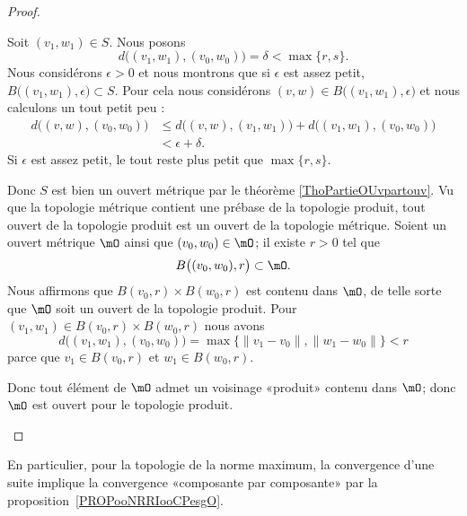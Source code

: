 \begin{proof}
\begin{subproof}
\begin{subproof}
			Soit \( (v_1,w_1)\in S\). Nous posons
			\begin{equation}
				d\big( (v_1,w_1), (v_0,w_0) \big)=\delta<\max\{ r,s \}.
			\end{equation}
			Nous considérons \( \epsilon>0\) et nous montrons que si \( \epsilon\) est assez petit, \( B\big( (v_1,w_1),\epsilon \big)\subset S\). Pour cela nous considérons \( (v,w)\in B\big( (v_1,w_1),\epsilon \big)\) et nous calculons un tout petit peu :
			\begin{subequations}
				\begin{align}
					d\big( (v,w),(v_0,w_0) \big) & \leq d\big( (v,w),(v_1,w_1) \big)+d\big( (v_1,w_1),(v_0,w_0) \big) \\
					                             & <\epsilon+\delta.
				\end{align}
			\end{subequations}
			Si \( \epsilon\) est assez petit, le tout reste plus petit que \( \max\{ r,s \}\).

			Donc \( S\) est bien un ouvert métrique par le théorème \ref{ThoPartieOUvpartouv}. Vu que la topologie métrique contient une prébase de la topologie produit, tout ouvert de la topologie produit est un ouvert de la topologie métrique.
			Soient un ouvert métrique \( \mO\) ainsi que \( (v_0,w_0)\in \mO\); il existe \( r>0\) tel que
			\begin{equation}
				B\big( (v_0,w_0),r \big)\subset \mO.
			\end{equation}
			Nous affirmons que \( B(v_0,r)\times B(w_0,r)\) est contenu dans \( \mO\), de telle sorte que \( \mO\) soit un ouvert de la topologie produit. Pour \( (v_1,w_1)\in B(v_0,r)\times B(w_0,r)\) nous avons
			\begin{equation}
				d\big( (v_1,w_1),(v_0,w_0) \big)=\max\{ \| v_1-v_0 \|,\| w_1-w_0 \| \}<r
			\end{equation}
			parce que \( v_1\in B(v_0,r)\) et \( w_1\in B(w_0,r)\).

			Donc tout élément de \( \mO\) admet un voisinage «produit» contenu dans \( \mO\); donc \( \mO\) est ouvert pour le topologie produit.
		\end{subproof}
	\end{subproof}
\end{proof}

\begin{normaltext}
	En particulier, pour la topologie de la norme maximum, la convergence d'une suite implique la convergence «composante par composante» par la proposition~\ref{PROPooNRRIooCPesgO}.
\end{normaltext}

